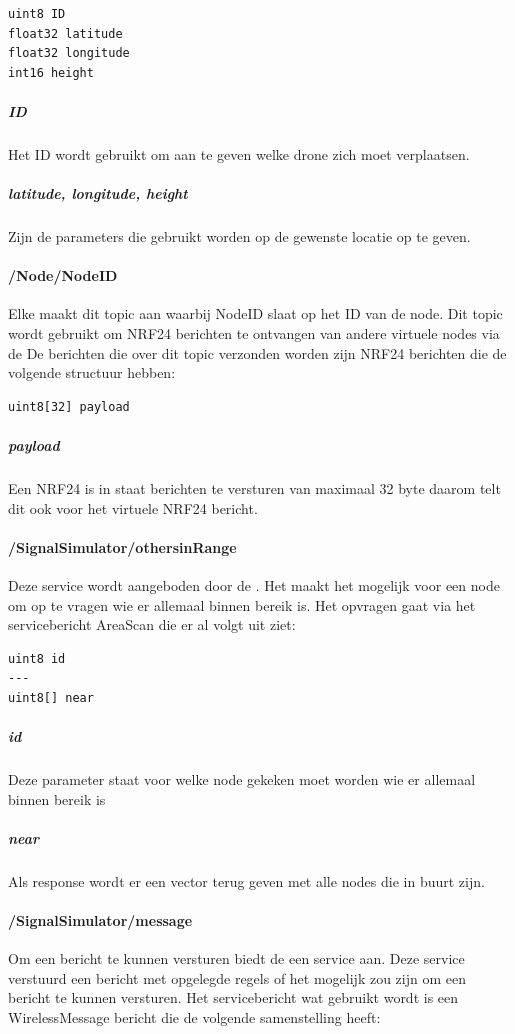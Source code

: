 \documentclass[a4paper, 11pt, oneside]{report}
\begin{document}
\begin{lstlisting}
uint8 ID
float32 latitude
float32 longitude
int16 height
\end{lstlisting}

\subparagraph{ID} Het ID wordt gebruikt om aan te geven welke drone zich moet verplaatsen.
\subparagraph{latitude, longitude, height} Zijn de parameters die gebruikt worden op de gewenste locatie op te geven.

\paragraph{/Node/NodeID}
\label{DetailedDesign:ros:intern:rosinterfaces:topic:node}
Elke  maakt dit topic aan waarbij NodeID slaat op het ID van de node. 
Dit topic wordt gebruikt om NRF24 berichten te ontvangen van andere virtuele nodes via de   
De berichten die over dit topic verzonden worden zijn NRF24 berichten die de volgende structuur hebben:

\begin{lstlisting} 
uint8[32] payload
\end{lstlisting}

\subparagraph{payload} Een NRF24 is in staat berichten te versturen van maximaal 32 byte daarom telt dit ook voor het virtuele NRF24 bericht.


\paragraph{/SignalSimulator/othersinRange}
\label{DetailedDesign:ros:intern:rosinterfaces:service:ss:range}
Deze service wordt aangeboden door de .
Het maakt het mogelijk voor een node om op te vragen wie er allemaal binnen bereik is.
Het opvragen gaat via het servicebericht AreaScan die er al volgt uit ziet:

\begin{lstlisting}
uint8 id
---
uint8[] near
\end{lstlisting}

\subparagraph{id} Deze parameter staat voor welke node gekeken moet worden wie er allemaal binnen bereik is
\subparagraph{near} Als response wordt er een vector terug geven met alle nodes die in buurt zijn.

\paragraph{/SignalSimulator/message}
\label{DetailedDesign:ros:intern:rosinterfaces:service:ss:message}
Om een bericht te kunnen versturen biedt de   een service aan. 
Deze service verstuurd een bericht met opgelegde regels of het mogelijk zou zijn om een bericht te kunnen versturen.
Het servicebericht wat gebruikt wordt is een WirelessMessage bericht die de volgende samenstelling heeft:
\end{document}
